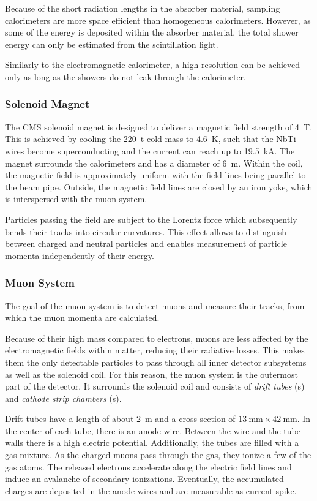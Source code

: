 Because of the short radiation lengths in the absorber material, sampling calorimeters are more space efficient than homogeneous calorimeters.
However, as some of the energy is deposited within the absorber material, the total shower energy can only be estimated from the scintillation light.

Similarly to the electromagnetic calorimeter, a high resolution can be achieved only as long as the showers do not leak through the calorimeter.

\subsubsection{Solenoid Magnet}
The \ac{CMS} solenoid magnet is designed to deliver a magnetic field strength of \SI{4}{\tesla}. This is achieved by cooling the \SI{220}{\tonne} cold mass to \SI{4.6}{\kelvin}, such that the NbTi wires become superconducting and the current can reach up to \SI{19.5}{\kilo\ampere}.
The magnet surrounds the calorimeters and has a diameter of \SI{6}{\meter}. Within the coil, the magnetic field is approximately uniform with the field lines being parallel to the beam pipe. Outside, the magnetic field lines are closed by an iron yoke, which is interspersed with the muon system.

Particles passing the field are subject to the Lorentz force which subsequently bends their tracks into circular curvatures. This effect allows to distinguish between charged and neutral particles and enables measurement of particle momenta independently of their energy.

\subsubsection{Muon System}
The goal of the muon system is to detect muons and measure their tracks, from which the muon momenta are calculated.

Because of their high mass compared to electrons, muons are less affected by the electromagnetic fields within matter, reducing their radiative losses. This makes them the only detectable particles to pass through all inner detector subsystems as well as the solenoid coil.
For this reason, the muon system is the outermost part of the detector. It surrounds the solenoid coil and consists of \emph{drift tubes} (s) and \emph{cathode strip chambers} (s). 

Drift tubes have a length of about \SI{2}{\meter} and a cross section of $\SI{13}{\milli\meter} \times \SI{42}{\milli\meter}$. In the center of each tube, there is an anode wire. Between the wire and the tube walls there is a high electric potential. Additionally, the tubes are filled with a gas mixture. 
As the charged muons pass through the gas, they ionize a few of the gas atoms. The released electrons accelerate along the electric field lines and induce an avalanche of secondary ionizations. Eventually, the accumulated charges are deposited in the anode wires and are measurable as current spike\cite{ParticleDataGroup:ReviewParticlePhysics}.

